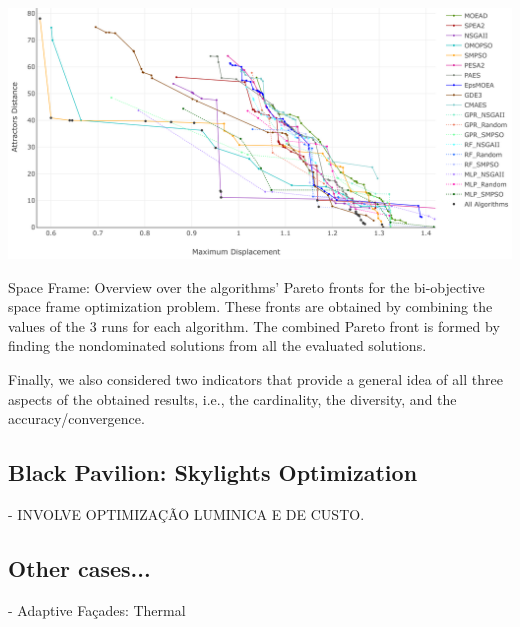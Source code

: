 \begin{table}[htbp]
	\centering
	\includegraphics[width=\textwidth]{Images/Evaluation/caadria/All_Algorithms_all_runs-2019-04-13_600dpi.png}
	\caption[Space Frame: Overview over the algorithms' Pareto fronts]{Space Frame: Overview over the algorithms' Pareto fronts for the bi-objective space frame optimization problem. These fronts are obtained by combining the values of the 3 runs for each algorithm. The combined Pareto front is formed by finding the nondominated solutions from all the evaluated solutions.}
	\label{table:spaceframestd}
\end{table}

Finally, we also considered two indicators that provide a general idea of all three aspects of the obtained results, i.e., the cardinality, the diversity, and the accuracy/convergence.

\subsection{Black Pavilion: Skylights Optimization}

- INVOLVE OPTIMIZAÇÃO LUMINICA E DE CUSTO.


\subsection{Other cases...}

- Adaptive Façades: Thermal